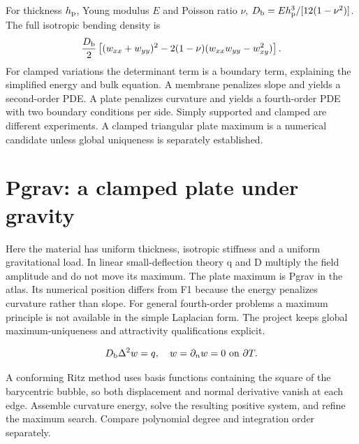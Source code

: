 \documentclass[11pt,oneside,openany]{book}
\begin{document}
For thickness $h_{\rm p}$, Young modulus $E$ and Poisson ratio $\nu$,
$D_{\rm b}=Eh_{\rm p}^3/[12(1-\nu^2)]$.
The full isotropic bending density is
\[
\frac{D_{\rm b}}2
\left[(w_{xx}+w_{yy})^2
-2(1-\nu)(w_{xx}w_{yy}-w_{xy}^2)\right].
\]
For clamped variations the determinant term is a boundary term,
explaining the simplified energy and bulk equation.
A membrane penalizes slope and yields a second-order PDE.
A plate penalizes curvature and yields a fourth-order PDE with
two boundary conditions per side. Simply supported and clamped
are different experiments.
A clamped triangular plate maximum is a numerical candidate unless
global uniqueness is separately established.




\section{Pgrav: a clamped plate under gravity}\label{sec:slide40}

Here the material has uniform thickness, isotropic stiffness and a uniform gravitational load. In linear small-deflection theory q and D multiply the field amplitude and do not move its maximum. The plate maximum is Pgrav in the atlas. Its numerical position differs from F1 because the energy penalizes curvature rather than slope. For general fourth-order problems a maximum principle is not available in the simple Laplacian form. The project keeps global maximum-uniqueness and attractivity qualifications explicit.


\[D_{\rm b}\Delta^2w=q,\quad w=\partial_nw=0\ \hbox{on }\partial T.\]


A conforming Ritz method uses basis functions containing the square of the barycentric bubble, so both displacement and normal derivative vanish at each edge. Assemble curvature energy, solve the resulting positive system, and refine the maximum search. Compare polynomial degree and integration order separately.
\end{document}
